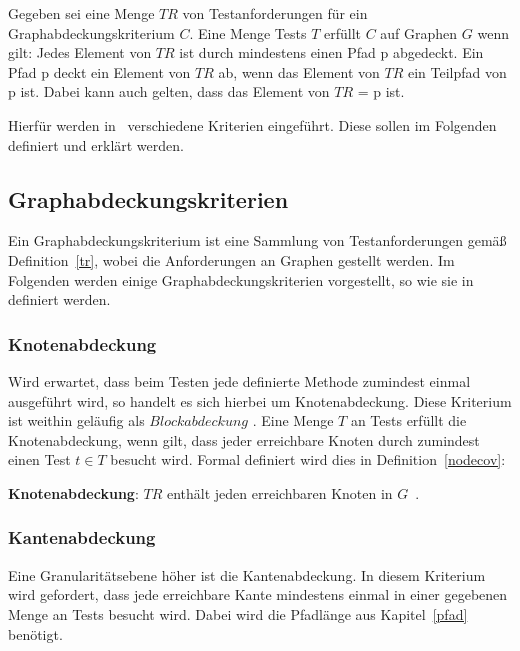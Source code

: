 \begin{definition}
    Gegeben sei eine Menge $TR$ von Testanforderungen für ein Graphabdeckungskriterium $C$.
    Eine Menge Tests $T$ erfüllt $C$ auf Graphen $G$ wenn gilt: Jedes Element von $TR$ ist durch mindestens einen Pfad p abgedeckt.
    Ein Pfad p deckt ein Element von $TR$ ab, wenn das Element von $TR$ ein Teilpfad von p ist.
    Dabei kann auch gelten, dass das Element von $TR$ = p ist.
    \cite[vgl. Def. 2.32]{software-testing}
    \label{graphcov}
\end{definition}

Hierfür werden in~\cite{software-testing} verschiedene Kriterien eingeführt.
Diese sollen im Folgenden definiert und erklärt werden.

\subsection{Graphabdeckungskriterien}

Ein Graphabdeckungskriterium ist eine Sammlung von Testanforderungen gemäß Definition~\ref{tr}, wobei die Anforderungen an Graphen gestellt werden.
Im Folgenden werden einige Graphabdeckungskriterien vorgestellt, so wie sie in~\cite{software-testing} definiert werden.

\subsubsection{Knotenabdeckung}

Wird erwartet, dass beim Testen jede definierte Methode zumindest einmal ausgeführt wird, so handelt es sich hierbei um Knotenabdeckung.
Diese Kriterium ist weithin geläufig als $Blockabdeckung$ \cite[vgl. 2.2.1]{software-testing}.
Eine Menge $T$ an Tests erfüllt die Knotenabdeckung, wenn gilt, dass jeder erreichbare Knoten durch zumindest einen Test $t \in T$ besucht wird.
Formal definiert wird dies in Definition~\ref{nodecov}:

\begin{definition}
    \textbf{Knotenabdeckung}: $TR$ enthält jeden erreichbaren Knoten in $G$~\cite[vgl. Criterion 2.1]{software-testing}.
    \label{nodecov}
\end{definition}


\subsubsection{Kantenabdeckung}
\label{kantenabdeck}
Eine Granularitätsebene höher ist die Kantenabdeckung.
In diesem Kriterium wird gefordert, dass jede erreichbare Kante mindestens einmal in einer gegebenen Menge an Tests besucht wird.
Dabei wird die Pfadlänge aus Kapitel~\ref{pfad} benötigt.

